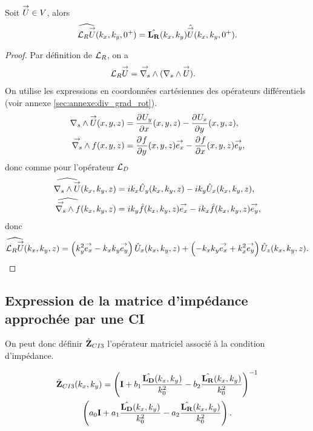     \begin{prop}
      Soit \(\vect{U} \in V\), alors
      \begin{equation*}
        \widehat{\LR \vect{U}} (k_x,k_y,0^+) = \hat{\mLR}(k_x,k_y) \hat{\vect{U}}(k_x,k_y,0^+).
      \end{equation*}
    \end{prop}

    \begin{proof}
      Par définition de \(\LR\), on a
      \begin{align*}
        \LR \vect{U} & = \vrots{} (\rots{} \vect{U}).
      \end{align*}
      On utilise les expressions en coordonnées cartésiennes des opérateurs différentiels (voir annexe \ref{sec:annexe:div_grad_rot}).
      \begin{align*}
        \rots{\vect{U}}(x,y,z) &= \ddr{x}{U_y}(x,y,z) - \ddr{y}{U_x}(x,y,z),
        \\
        \vrots{f}(x,y,z) &= \ddr{y}{f}(x,y,z)\vect{e_x} - \ddr{x}{f}(x,y,z)\vect{e_y},
      \end{align*}
      donc comme pour l'opérateur \(\LD\)
      \begin{align*}
        \widehat{\rots{\vect{U}}}(k_x,k_y,z) &= ik_x{\hat{U}_y}(k_x,k_y,z) - ik_y{\hat{U}_x}(k_x,k_y,z),
        \\
        \widehat{\vrots{f}}(k_x,k_y,z) &=  ik_y\hat{f}(k_x,k_y,z)\vect{e_x} - ik_x\hat{f}(k_x,k_y,z)\vect{e_y},
      \end{align*}
      donc
      \begin{align*}
        \widehat{\LR{\vect{U}}}(k_x,k_y,z) =  \left({k_y^2}\vect{e_x} -k_xk_y\vect{e_y}\right){\hat{U}_x}(k_x,k_y,z) + \left(-k_xk_y\vect{e_x} + k_x^2\vect{e_y}\right){\hat{U}_z}(k_x,k_y,z).
      \end{align*}
    \end{proof}

  \subsection{Expression de la matrice d'impédance approchée par une CI}

    On peut donc définir \(\hat{\mZ}_{CI3}\) l’opérateur matriciel associé à la condition d'impédance.

    \begin{multline}
      \label{eq:plan:hoibc:ci3}
      \hat{\mZ}_{CI3}(k_x,k_y) = \left(\mI + b_1 \frac{\hat{\mLD}(k_x,k_y)}{k_0^2} - b_2 \frac{\hat{\mLR}(k_x,k_y)}{k_0^2} \right)^{-1}\\\left(a_0 \mI + a_1 \frac{\hat{\mLD}(k_x,k_y)}{k_0^2} - a_2 \frac{\hat{\mLR}(k_x,k_y)}{k_0^2}\right).
    \end{multline}


